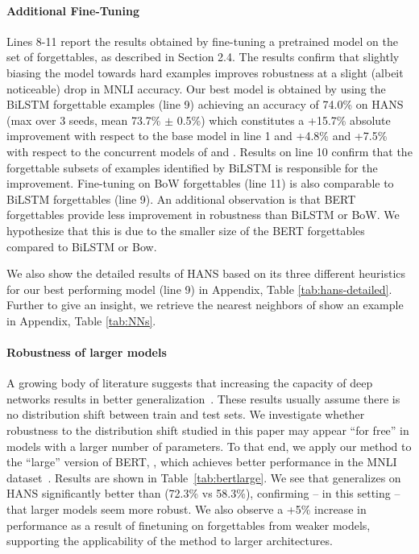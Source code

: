 \paragraph{Additional Fine-Tuning} Lines 8-11 report the results obtained by fine-tuning a pretrained model on the set of forgettables, as described in Section 2.4. The results confirm that slightly biasing the model towards hard examples improves robustness at a slight (albeit noticeable) drop in MNLI accuracy. 
Our best model is obtained by using the BiLSTM forgettable examples (line 9) achieving an accuracy of 74.0\% on HANS (max over 3 seeds, mean 73.7\% $\pm$ 0.5\%)
which constitutes a +15.7\% absolute improvement with respect to the base model in line 1 and +4.8\% and +7.5\% with respect to the concurrent models of  and . 
Results on line 10 confirm that the forgettable subsets of examples identified by BiLSTM is responsible for the improvement. 
Fine-tuning on BoW forgettables (line 11) is also comparable to BiLSTM forgettables (line 9).
An additional observation is that BERT forgettables provide less improvement in robustness than BiLSTM or BoW. 
We hypothesize that this is due to the smaller size of the BERT forgettables compared to BiLSTM or Bow.

We also show the detailed results of HANS based on its three different heuristics for our best performing model (line 9) in Appendix, Table \ref{tab:hans-detailed}. 
Further to give an insight, we retrieve the nearest neighbors 
of show an example in Appendix, Table \ref{tab:NNs}. 




\paragraph{Robustness of larger models} 
A growing body of literature suggests that increasing the capacity of deep networks results in better generalization~. These results usually assume there is no distribution shift between train and test sets. We investigate whether robustness to the distribution shift studied in this paper may appear ``for free'' in models with a larger number of parameters. To that end, we apply our method to the ``large'' version of BERT, \bertlarge, which 
achieves better performance in the MNLI dataset~\cite{devlin2018bert}. Results are shown in Table~\ref{tab:bertlarge}. We see that \bertlarge generalizes on HANS significantly better than \bertbase (72.3\% vs 58.3\%), confirming -- in this setting -- that larger models seem more robust. We also observe a +5\% increase in performance as a result of finetuning on forgettables from weaker models, supporting the applicability of the method to larger architectures.

